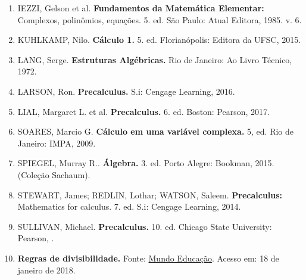 \begin{enumerate}[1.]
   \item IEZZI, Gelson et al. \textbf{Fundamentos da Matemática Elementar:} Complexos, polinômios, equações. 5. ed. São Paulo: Atual Editora, 1985. v. 6.
     
  \item KUHLKAMP, Nilo. \textbf{Cálculo 1.} 5. ed. Florianópolis: Editora da UFSC, 2015.
  
  \item LANG, Serge. \textbf{Estruturas Algébricas.} Rio de Janeiro: Ao Livro Técnico, 1972.
  
  \item LARSON, Ron. \textbf{Precalculus.} S.i: Cengage Learning, 2016.
  
  \item LIAL, Margaret L. et al. \textbf{Precalculus.} 6. ed. Boston: Pearson, 2017.
  
  \item SOARES, Marcio G. \textbf{Cálculo em uma variável complexa.} 5, ed. Rio de Janeiro: IMPA, 2009.
  
  \item SPIEGEL, Murray R.. \textbf{Álgebra.} 3. ed. Porto Alegre: Bookman, 2015. (Coleção Sachaum).
  
  \item STEWART, James; REDLIN, Lothar; WATSON, Saleem. \textbf{Precalculus:} Mathematics for calculus. 7. ed. S.i: Cengage Learning, 2014.
  
  \item SULLIVAN, Michael. \textbf{Precalculus.} 10. ed. Chicago State University: Pearson, .
  
  \item \textbf{Regras de divisibilidade.} Fonte: \href{http://mundoeducacao.bol.uol.com.br/matematica/regras-divisibilidade.htm}{Mundo Educação}. Acesso em: 18 de janeiro de 2018.

 

 
  




  \end{enumerate}
